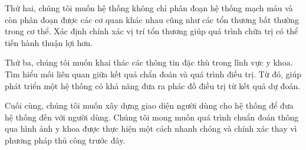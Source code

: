 	Thứ hai, chúng tôi muốn hệ thống không chỉ phân đoạn hệ thống mạch máu và còn phân đoạn được các cơ quan khác nhau cũng như các tổn thương bất thường trong cơ thể. Xác định chính xác vị trí tổn thương giúp quá trình chữa trị có thể tiến hành thuận lợi hơn.
	
	Thứ ba, chúng tôi muốn khai thác các thông tin đặc thù trong lĩnh vực y khoa. Tìm hiểu mối liên quan giữa kết quả chẩn đoán và quá trình điều trị. Từ đó, giúp phát triển một hệ thống có khả năng đưa ra phác đồ điều trị từ kết quả dự đoán.
	
	Cuối cùng, chúng tôi muốn xây dựng giao diện người dùng cho hệ thống để đưa hệ thống đến với người dùng. Chúng tôi mong muốn quá trình chuẩn đoán thông qua hình ảnh y khoa được thực hiện một cách nhanh chóng và chính xác thay vì phương pháp thủ công trước đây.